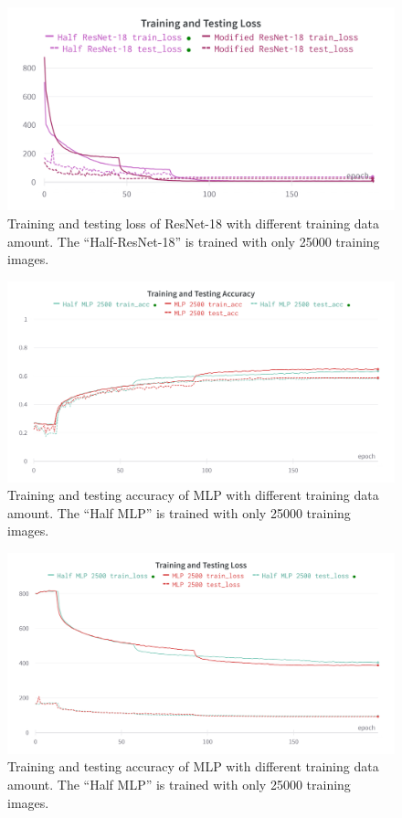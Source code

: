 \documentclass[twocolumn]{extarticle}
\begin{document}
\begin{appendices}
\begin{figure}[H]
\centering
\includegraphics[width=0.9\linewidth]{charts/resnet-half-cifar-loss}
\caption{Training and testing loss of ResNet-18 with different training data amount. The ``Half-ResNet-18'' is trained with only 25000 training images.}
\label{fig:resnet-half-cifar-loss}
\end{figure}

\begin{figure}[H]
\centering
\includegraphics[width=0.9\linewidth]{charts/mlp-half-cifar-acc}
\caption{Training and testing accuracy of MLP with different training data amount. The ``Half MLP'' is trained with only 25000 training images.}
\label{fig:mlp-half-cifar-acc}
\end{figure}

\begin{figure}[H]
\centering
\includegraphics[width=0.9\linewidth]{charts/mlp-half-cifar-loss}
\caption{Training and testing accuracy of MLP with different training data amount. The ``Half MLP'' is trained with only 25000 training images.}
\label{fig:mlp-half-cifar-loss}
\end{figure}


\end{appendices}
\end{document}
